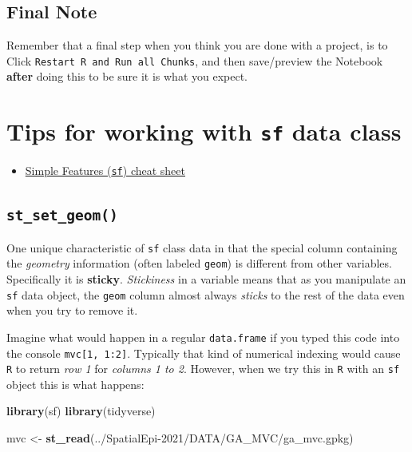 \documentclass[
]{book}
\newenvironment{Shaded}{\begin{snugshade}}{\end{snugshade}}
\newcommand{\FunctionTok}[1]{\textcolor[rgb]{0.13,0.29,0.53}{\textbf{#1}}}
\newcommand{\NormalTok}[1]{#1}
\newcommand{\OtherTok}[1]{\textcolor[rgb]{0.56,0.35,0.01}{#1}}
\newcommand{\StringTok}[1]{\textcolor[rgb]{0.31,0.60,0.02}{#1}}
\providecommand{\tightlist}{%
  \setlength{\itemsep}{0pt}\setlength{\parskip}{0pt}}
\begin{document}
\hypertarget{final-note}{%
\section{Final Note}\label{final-note}}

Remember that a final step when you think you are done with a project, is to Click \texttt{Restart\ R\ and\ Run\ all\ Chunks}, and then save/preview the Notebook \textbf{after} doing this to be sure it is what you expect.

\hypertarget{sf-overview}{%
\chapter{\texorpdfstring{Tips for working with \texttt{sf} data class}{Tips for working with sf data class}}\label{sf-overview}}

\begin{itemize}
\tightlist
\item
  \href{https://github.com/rstudio/cheatsheets/blob/main/sf.pdf}{Simple Features (\texttt{sf}) cheat sheet}
\end{itemize}

\hypertarget{st_set_geom}{%
\section{\texorpdfstring{\texttt{st\_set\_geom()}}{st\_set\_geom()}}\label{st_set_geom}}

One unique characteristic of \texttt{sf} class data in that the special column containing the \emph{geometry} information (often labeled \texttt{geom}) is different from other variables. Specifically it is \textbf{sticky}. \emph{Stickiness} in a variable means that as you manipulate an \texttt{sf} data object, the \texttt{geom} column almost always \emph{sticks} to the rest of the data even when you try to remove it.

Imagine what would happen in a regular \texttt{data.frame} if you typed this code into the console \texttt{mvc{[}1,\ 1:2{]}}. Typically that kind of numerical indexing would cause \texttt{R} to return \emph{row 1} for \emph{columns 1 to 2}. However, when we try this in \texttt{R} with an \texttt{sf} object this is what happens:

\begin{Shaded}
\begin{Highlighting}[]
\FunctionTok{library}\NormalTok{(sf)}
\FunctionTok{library}\NormalTok{(tidyverse)}

\NormalTok{mvc }\OtherTok{\textless{}{-}} \FunctionTok{st\_read}\NormalTok{(}\StringTok{\textquotesingle{}../SpatialEpi{-}2021/DATA/GA\_MVC/ga\_mvc.gpkg\textquotesingle{}}\NormalTok{)}
\end{Highlighting}
\end{Shaded}
\end{document}
